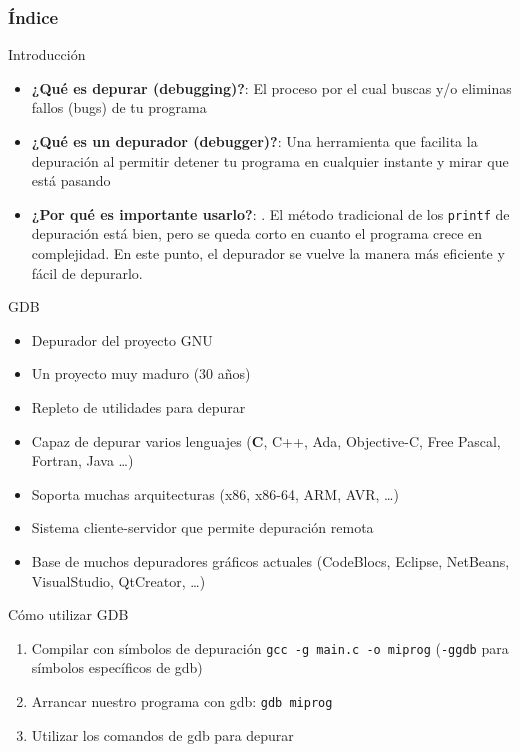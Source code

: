 \documentclass{mybeamer}
\institute{
	{\textsl{\large Tema 13}}
	\\[1em]
	\textbf{\Large Depuración}
}
\begin{document}
\begin{frame}
\titlepage
\end{frame}

\begin{frame}
\frametitle{Índice}
	\tableofcontents
\end{frame}

\begin{framesec}{Introducción}
	\begin{itemize}
		\item \textbf{¿Qué es depurar (debugging)?}: El proceso por el
			cual buscas y/o eliminas fallos (bugs) de tu programa

		\item \textbf{¿Qué es un depurador (debugger)?}: Una herramienta
			que facilita la depuración al permitir detener tu
			programa en cualquier instante y mirar que está pasando

		\item \textbf{¿Por qué es importante usarlo?}: . El método
			tradicional de los \texttt{printf} de depuración está
			bien, pero se queda corto en cuanto el programa crece en
			complejidad. En este punto, el depurador se vuelve la
			manera más eficiente y fácil de depurarlo.
	\end{itemize}
\end{framesec}

\begin{framesec}{GDB}
	\begin{itemize}
		\item Depurador del proyecto GNU
		\item Un proyecto muy maduro (30 años)
		\item Repleto de utilidades para depurar
		\item Capaz de depurar varios lenguajes (\textbf{C}, C++, Ada,
			Objective-C, Free Pascal, Fortran, Java \ldots)
		\item Soporta muchas arquitecturas (x86, x86-64, ARM, AVR,
			\ldots)
		\item Sistema cliente-servidor que permite depuración remota
		\item Base de muchos depuradores gráficos actuales (CodeBlocs,
			Eclipse, NetBeans, VisualStudio, QtCreator, \ldots)
	\end{itemize}
\end{framesec}

\begin{framesec}{Cómo utilizar GDB}
	\begin{enumerate}
		\item Compilar con símbolos de depuración \texttt{gcc -g main.c
			-o miprog} (\texttt{-ggdb} para símbolos específicos de
			gdb)
		\item Arrancar nuestro programa con gdb: \texttt{gdb miprog}
		\item Utilizar los comandos de gdb para depurar
	\end{enumerate}
\end{framesec}
\end{document}
